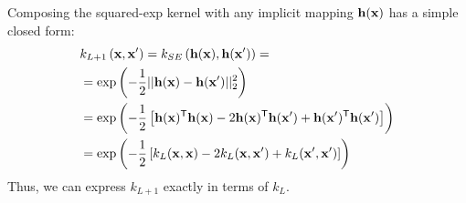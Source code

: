 Composing the squared-exp kernel with any implicit mapping ${\bf{h}}({\bf{x}})$ has a simple closed form:
%
\begin{align}
& k_{L+1} \left( {\bf{x}}, {\bf{x}}' \right) = k_{SE} \left( {\bf{h}}({\bf{x}}), {\bf{h}}({\bf{x}}') \right) =  \\
& = \exp \left( -\frac{1}{2} || {\bf{h}}({\bf{x}}) - {\bf{h}}({\bf{x}}')||_2^2 \right) \nonumber\\
& = \exp\left ( -\frac{1}{2} \left[ {\bf{h}}({\bf{x}}) {^\mathsf{T}} {\bf{h}}({\bf{x}}) - 2 {\bf{h}}({\bf{x}}) {^\mathsf{T}} {\bf{h}}({\bf{x}}') + {\bf{h}}({\bf{x}}') {^\mathsf{T}} {\bf{h}}({\bf{x}}') \right] \right) \nonumber \\
& = \exp \left( -\frac{1}{2} \left[ k_{L}({\bf{x}}, {\bf{x}}) - 2 k_{L}({\bf{x}}, {\bf{x}}') + k_{L}({\bf{x}}', {\bf{x}}') \right] \right) \nonumber
\end{align}
%
%
%
Thus, we can express $k_{L+1}$ exactly in terms of $k_L$.

